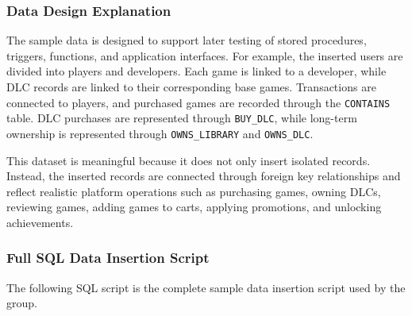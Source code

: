 \subsubsection{Data Design Explanation}

The sample data is designed to support later testing of stored procedures, triggers, functions, and application interfaces. 
For example, the inserted users are divided into players and developers. 
Each game is linked to a developer, while DLC records are linked to their corresponding base games. 
Transactions are connected to players, and purchased games are recorded through the \texttt{CONTAINS} table. 
DLC purchases are represented through \texttt{BUY\_DLC}, while long-term ownership is represented through \texttt{OWNS\_LIBRARY} and \texttt{OWNS\_DLC}.

This dataset is meaningful because it does not only insert isolated records. 
Instead, the inserted records are connected through foreign key relationships and reflect realistic platform operations such as purchasing games, owning DLCs, reviewing games, adding games to carts, applying promotions, and unlocking achievements.
\subsubsection{Full SQL Data Insertion Script}

The following SQL script is the complete sample data insertion script used by the group.

